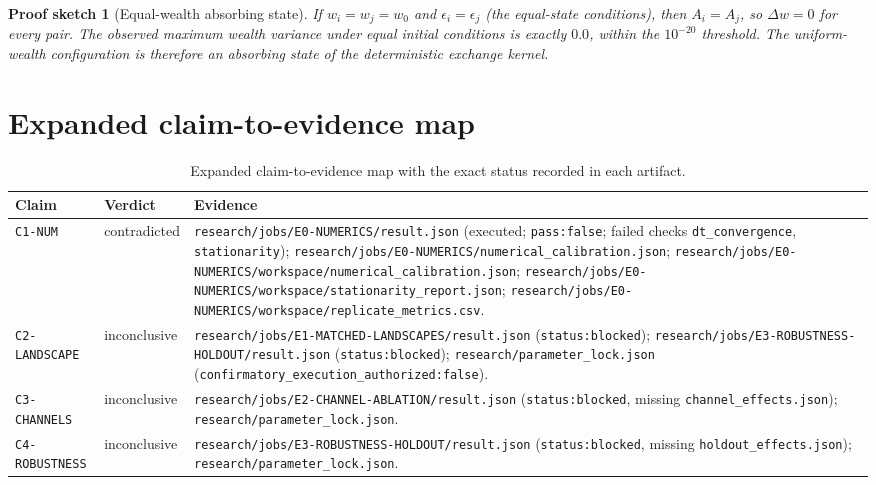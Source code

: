 \documentclass[11pt,a4paper]{article}
\newtheorem{sketch}{Proof sketch}
\newcommand{\code}[1]{\texttt{#1}}
\begin{document}
\begin{sketch}[Equal-wealth absorbing state]
If $w_i=w_j=w_0$ and $\epsilon_i=\epsilon_j$ (the equal-state conditions), then
$A_i=A_j$, so $\Delta w=0$ for every pair. The observed maximum wealth variance
under equal initial conditions is exactly $0.0$, within the $10^{-20}$
threshold. The uniform-wealth configuration is therefore an absorbing state of
the deterministic exchange kernel.
\end{sketch}

\section{Expanded claim-to-evidence map}
\label{sec:map}

\begin{table}[htbp]
\centering
\small
\begin{tabular}{@{}llp{8.6cm}@{}}
\toprule
\textbf{Claim} & \textbf{Verdict} & \textbf{Evidence} \\
\midrule
\code{C1-NUM} & contradicted &
\code{research/jobs/E0-NUMERICS/result.json} (executed; \code{pass:false}; failed checks \code{dt\_convergence}, \code{stationarity});\newline
\code{research/jobs/E0-NUMERICS/numerical\_calibration.json};\newline
\code{research/jobs/E0-NUMERICS/workspace/numerical\_calibration.json};\newline
\code{research/jobs/E0-NUMERICS/workspace/stationarity\_report.json};\newline
\code{research/jobs/E0-NUMERICS/workspace/replicate\_metrics.csv}. \\
\code{C2-LANDSCAPE} & inconclusive &
\code{research/jobs/E1-MATCHED-LANDSCAPES/result.json} (\code{status:blocked});\newline
\code{research/jobs/E3-ROBUSTNESS-HOLDOUT/result.json} (\code{status:blocked});\newline
\code{research/parameter\_lock.json} (\code{confirmatory\_execution\_authorized:false}). \\
\code{C3-CHANNELS} & inconclusive &
\code{research/jobs/E2-CHANNEL-ABLATION/result.json} (\code{status:blocked}, missing \code{channel\_effects.json});\newline
\code{research/parameter\_lock.json}. \\
\code{C4-ROBUSTNESS} & inconclusive &
\code{research/jobs/E3-ROBUSTNESS-HOLDOUT/result.json} (\code{status:blocked}, missing \code{holdout\_effects.json});\newline
\code{research/parameter\_lock.json}. \\
\bottomrule
\end{tabular}
\caption{Expanded claim-to-evidence map with the exact status recorded in each
artifact.}
\label{tab:map}
\end{table}
\end{document}
